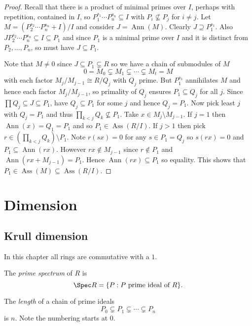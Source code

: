 \documentclass[a4paper]{article}
\DeclareMathOperator{\Ann}{Ann} %
\DeclareMathOperator{\Ass}{Ass} %
\begin{document}
\begin{proof}
  Recall that there is a product of minimal primes over \(I\), perhaps with repetition, contained in \(I\), so \(P_1^{s_1} \cdots P_n^{s_n} \subseteq I\) with \(P_i \nsubseteq P_j\) for \(i \neq j\). Let \(M = (P_2^{s_2} \cdots P_n^{s_n} + I)/I\) and consider \(J = \Ann(M)\). Clearly \(J \supseteq P_1^{s_1}\). Also \(JP_2^{s_2} \cdots P_n^{s_n} \subseteq I \subseteq P_1\) and since \(P_1\) is a minimal prime over \(I\) and it is distinct from \(P_2, \dots, P_n\), so must have \(J \subseteq P_1\).

  Note that \(M \neq 0\) since \(J \subseteq P_1 \subsetneq R\) so we have a chain of submodules of \(M\)
  \[
    0 = M_0 \subsetneq M_1 \subsetneq \cdots \subsetneq M_t = M
  \]
  with each factor \(M_j/M_{j - 1} \cong R/Q_j\) with \(Q_j\) prime. But \(P_1^{s_1}\) annihilates \(M\) and hence each factor \(M_j/M_{j - 1}\), so primality of \(Q_j\) ensures \(P_1 \subseteq Q_j\) for all \(j\). Since \(\prod Q_j \subseteq J \subseteq P_1\), have \(Q_j \subseteq P_1\) for some \(j\) and hence \(Q_j = P_1\). Now pick least \(j\) with \(Q_j = P_1\) and thus \(\prod_{k < j} Q_k \nsubseteq P_1\). Take \(x \in M_j \setminus M_{j - 1}\). If \(j = 1\) then \(\Ann(x) = Q_1 = P_1\) and so \(P_1 \in \Ass(R/I)\). If \(j > 1\) then pick \(r \in (\prod_{k < j} Q_k) \setminus P_1\). Note \(r(sx) = 0\) for any \(s \in P_1 = Q_j\) so \(s(rx) = 0\) and \(P_1 \subseteq \Ann(rx)\). However \(rx \notin M_{j - 1}\) since \(r \notin P_1\) and \(\Ann(rx + M_{j - 1}) = P_1\). Hence \(\Ann(rx) \subseteq P_1\) so equality. This shows that \(P_1 \in \Ass(M) \subseteq \Ass(R/I)\).
\end{proof}

\section{Dimension}

\subsection{Krull dimension}

In this chapter all rings are commutative with a \(1\).

\begin{definition}
  The \emph{prime spectrum} of \(R\) is
  \[
    \Spec R = \{P: P \text{ prime ideal of } R\}.
  \]
\end{definition}

\begin{definition}[length]
  The \emph{length} of a chain of prime ideals
  \[
    P_0 \subsetneq P_1 \subsetneq \cdots \subsetneq P_n
  \]
  is \(n\). Note the numbering starts at \(0\).
\end{definition}
\end{document}
